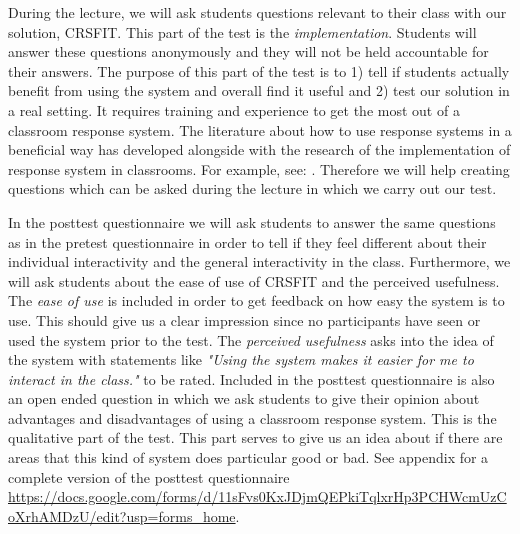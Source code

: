 During the lecture, we will ask students questions relevant to their class with our solution, CRSFIT. This part of the test is the \emph{implementation}. Students will answer these questions anonymously and they will not be held accountable for their answers. The purpose of this part of the test is to 1) tell if students actually benefit from using the system and overall find it useful and 2) test our solution in a real setting. It requires training and experience to get the most out of a classroom response system. The literature about how to use response systems in a beneficial way has developed alongside with the research of the implementation of response system in classrooms. For example, see: . Therefore we will help creating questions which can be asked during the lecture in which we carry out our test.

In the posttest questionnaire we will ask students to answer the same questions as in the pretest questionnaire in order to tell if they feel different about their individual interactivity and the general interactivity in the class. Furthermore, we will ask students about the ease of use of CRSFIT and the perceived usefulness. The \emph{ease of use} is included in order to get feedback on how easy the system is to use. This should give us a clear impression since no participants have seen or used the system prior to the test. The \emph{perceived usefulness} asks into the idea of the system with statements like \emph{"Using the system makes it easier for me to interact in the class."} to be rated. Included in the posttest questionnaire is also an open ended question in which we ask students to give their opinion about advantages and disadvantages of using a classroom response system. This is the qualitative part of the test. This part serves to give us an idea about if there are areas that this kind of system does particular good or bad. See appendix for a complete version of the posttest questionnaire \url{https://docs.google.com/forms/d/11sFvs0KxJDjmQEPkiTqlxrHp3PCHWcmUzCoXrhAMDzU/edit?usp=forms_home}. 




